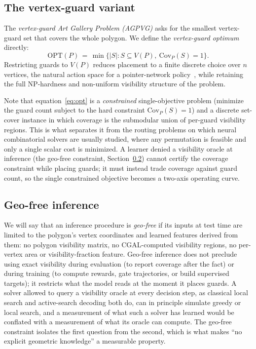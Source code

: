 \documentclass[11pt]{article}
\newcommand{\Covf}[1]{\mathrm{Cov}_P(#1)}
\newcommand{\OPT}{\mathrm{OPT}}
\begin{document}
\subsection{The vertex-guard variant}
\label{sec:problem-vertex}

The \emph{vertex-guard Art Gallery Problem (AGPVG)} asks for the smallest vertex-guard set that covers the whole polygon. We define the \emph{vertex-guard optimum} directly:
\begin{equation}
\OPT(P) \,=\, \min\bigl\{|S| : S \subseteq V(P),\ \Covf{S} = 1\bigr\}.
\label{eq:opt}
\end{equation}
Restricting guards to $V(P)$ reduces placement to a finite discrete choice over $n$ vertices, the natural action space for a pointer-network policy~\cite{Vinyals2015,Bello2016,Kool2019Attention,Kwon2020POMO}, while retaining the full NP-hardness and non-uniform visibility structure of the problem.

Note that equation~\eqref{eq:opt} is a \emph{constrained} single-objective problem (minimize the guard count subject to the hard constraint $\Covf{S} = 1$) and a discrete set-cover instance in which coverage is the submodular union of per-guard visibility regions. This is what separates it from the routing problems on which neural combinatorial solvers are usually studied, where any permutation is feasible and only a single scalar cost is minimized. A learner denied a visibility oracle at inference (the geo-free constraint, Section~\ref{sec:problem-geofree}) cannot certify the coverage constraint while placing guards; it must instead trade coverage against guard count, so the single constrained objective becomes a two-axis operating curve. 

\subsection{Geo-free inference}
\label{sec:problem-geofree}

We will say that an inference procedure is \emph{geo-free} if its inputs at test time are limited to the polygon's vertex coordinates and learned features derived from them: no polygon visibility matrix, no CGAL-computed visibility regions, no per-vertex area or visibility-fraction feature. Geo-free inference does not preclude using exact visibility during evaluation (to report coverage after the fact) or during training (to compute rewards, gate trajectories, or build supervised targets); it restricts what the model reads at the moment it places guards. A solver allowed to query a visibility oracle at every decision step, as classical local search and active-search decoding both do, can in principle simulate greedy or local search, and a measurement of what such a solver has learned would be conflated with a measurement of what its oracle can compute. The geo-free constraint isolates the first question from the second, which is what makes ``no explicit geometric knowledge'' a measurable property.
\end{document}

